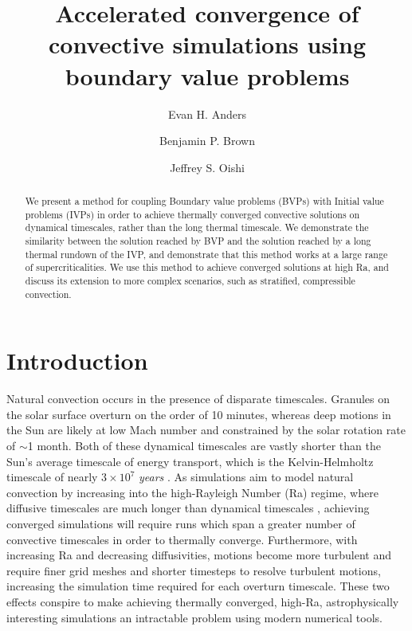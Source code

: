 \documentclass[aps, pre, onecolumn, nofootinbib, notitlepage, groupedaddress, amsfonts, amssymb, amsmath, longbibliography]{revtex4-1}
\begin{document}
\author{Evan H. Anders}
\author{Benjamin P. Brown}
\author{Jeffrey S. Oishi}
\title{Accelerated convergence of convective simulations using boundary value problems}

\begin{abstract}
We present a method for coupling Boundary value problems (BVPs) with Initial value problems (IVPs)
in order to achieve thermally converged convective solutions on dynamical timescales, rather than the
long thermal timescale.  We demonstrate the similarity between the solution reached by BVP and the
solution reached by a long thermal rundown of the IVP, and demonstrate that this method works at a
large range of supercriticalities.  We use this method to achieve converged solutions at high Ra,
and discuss its extension to more complex scenarios, such as stratified, compressible convection.
\end{abstract}
\maketitle

\section{Introduction}
\label{sec:intro}
Natural convection occurs in the presence of disparate timescales. Granules on the
solar surface overturn on the order of 10 minutes, whereas deep motions in the Sun are likely at
low Mach number and constrained by the solar rotation rate of $\sim$1 month.  
Both of these dynamical timescales are vastly shorter than the Sun's average timescale of energy transport,
which is the Kelvin-Helmholtz timescale of nearly $3 \times 10^7$ \emph{years} \cite{stix2003}. 
As simulations aim to model natural convection
by increasing into the high-Rayleigh Number (Ra) regime, where diffusive timescales are much
longer than dynamical timescales \cite{anders&brown2017}, achieving converged simulations will 
require runs which span a greater number of convective timescales in order to thermally converge.
Furthermore, with increasing Ra and decreasing diffusivities, motions become more turbulent
and require finer grid meshes and shorter timesteps to resolve turbulent motions, increasing the simulation
time required for each overturn timescale.  
These two effects conspire to make achieving thermally converged, high-Ra, astrophysically interesting
simulations an intractable problem using modern numerical tools.
\end{document}
